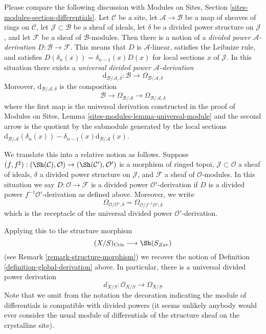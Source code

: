 \medskip\noindent
Please compare the following discussion with
Modules on Sites, Section \ref{sites-modules-section-differentials}. Let
$\mathcal{C}$ be a site, let $\mathcal{A} \to \mathcal{B}$ be a
map of sheaves of rings on $\mathcal{C}$, let $\mathcal{J} \subset \mathcal{B}$
be a sheaf of ideals, let $\delta$ be a divided power structure on
$\mathcal{J}$, and let $\mathcal{F}$ be a sheaf of $\mathcal{B}$-modules.
Then there is a notion of a {\it divided power $\mathcal{A}$-derivation}
$D : \mathcal{B} \to \mathcal{F}$. This means that $D$ is $\mathcal{A}$-linear,
satisfies the Leibnize rule, and satisfies
$D(\delta_n(x)) = \delta_{n - 1}(x)D(x)$ for local sections $x$ of
$\mathcal{J}$. In this situation there exists a
{\it universal divided power $\mathcal{A}$-derivation}
$$
\text{d}_{\mathcal{B}/\mathcal{A}, \delta} :
\mathcal{B}
\longrightarrow
\Omega_{\mathcal{B}/\mathcal{A}, \delta}
$$
Moreover, $\text{d}_{\mathcal{B}/\mathcal{A}, \delta}$ is the composition
$$
\mathcal{B}
\longrightarrow
\Omega_{\mathcal{B}/\mathcal{A}}
\longrightarrow
\Omega_{\mathcal{B}/\mathcal{A}, \delta}
$$
where the first map is the universal derivation constructed in the proof
of Modules on Sites, Lemma \ref{sites-modules-lemma-universal-module}
and the second arrow is the quotient by the submodule generated by
the local sections
$\text{d}_{\mathcal{B}/\mathcal{A}}(\delta_n(x)) -
\delta_{n - 1}(x)\text{d}_{\mathcal{B}/\mathcal{A}}(x)$.

\medskip\noindent
We translate this into a relative notion as follows. Suppose
$(f, f^\sharp) : (\Sh(\mathcal{C}), \mathcal{O}) \to
(\Sh(\mathcal{C}'), \mathcal{O}')$ is a morphism of ringed topoi,
$\mathcal{J} \subset \mathcal{O}$ a sheaf of ideals, $\delta$ a
divided power structure on $\mathcal{J}$, and $\mathcal{F}$ a sheaf
of $\mathcal{O}$-modules. In this situation we say
$D : \mathcal{O} \to \mathcal{F}$ is a divided power $\mathcal{O}'$-derivation
if $D$ is a divided power $f^{-1}\mathcal{O}'$-derivation as defined above.
Moreover, we write
$$
\Omega_{\mathcal{O}/\mathcal{O}', \delta} =
\Omega_{\mathcal{O}/f^{-1}\mathcal{O}', \delta}
$$
which is the receptacle of the universal divided power
$\mathcal{O}'$-derivation.

\medskip\noindent
Applying this to the structure morphism
$$
(X/S)_{\text{Cris}} \longrightarrow \Sh(S_{Zar})
$$
(see Remark \ref{remark-structure-morphism}) we recover the notion of
Definition \ref{definition-global-derivation} above.
In particular, there is a universal divided power derivation
$$
d_{X/S} : \mathcal{O}_{X/S} \to \Omega_{X/S}
$$
Note that we omit from the notation the decoration indicating the
module of differentials is compatible with divided powers (it seems
unlikely anybody would ever consider the usual module of differentials
of the structure sheaf on the crystalline site).

